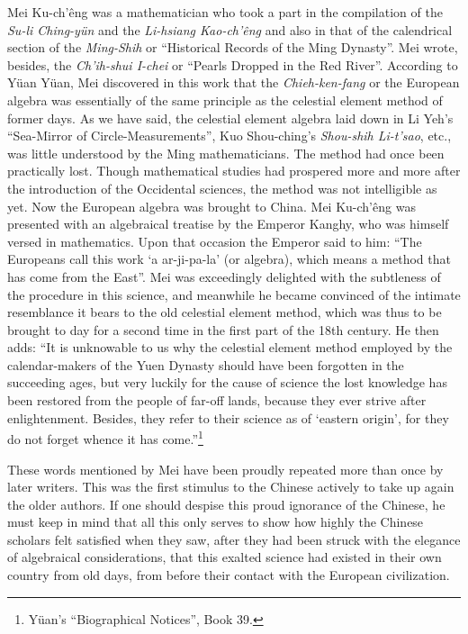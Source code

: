 \documentclass[11pt]{article}
\newcommand{\scanpage}[2]{\clearpage\setcounter{footnote}{0}\noindent{\footnotesize\color{gray}PDF page #1 · #2}\par\medskip}
\newcommand{\scanfooter}{}
\begin{document}
Mei Ku-ch'êng was a mathematician who took a part in the compilation of the \emph{Su-li Ching-yün} and the \emph{Li-hsiang Kao-ch'êng} and also in that of the calendrical section of the \emph{Ming-Shih} or ``Historical Records of the Ming Dynasty''. Mei wrote, besides, the \emph{Ch'ih-shui I-chei} or ``Pearls Dropped in the Red River''. According to Yüan Yüan, Mei discovered in this work that the \emph{Chieh-ken-fang} or the European algebra was essentially of the same principle as the celestial element method of former days. As we have said, the celestial element algebra laid down in Li Yeh's ``Sea-Mirror of Circle-Measurements'', Kuo Shou-ching's \emph{Shou-shih Li-t'sao}, etc., was little understood by the Ming mathematicians. The method had once been practically lost. Though mathematical studies had prospered more and more after the introduction of the Occidental sciences, the method was not intelligible as yet. Now the European algebra was brought to China. Mei Ku-ch'êng was presented with an algebraical treatise by the Emperor Kanghy, who was himself versed in mathematics. Upon that occasion the Emperor said to him: ``The Europeans call this work `a ar-ji-pa-la' (or algebra), which means a method that has come from the East''. Mei was exceedingly delighted with the subtleness of the procedure in this science, and meanwhile he became convinced of the intimate resemblance it bears to the old celestial element method, which was thus to be brought to day for a second time in the first part of the 18th century. He then adds: ``It is unknowable to us why the celestial element method employed by the calendar-makers of the Yuen Dynasty should have been forgotten in the succeeding ages, but very luckily for the cause of science the lost knowledge has been restored from the people of far-off lands, because they ever strive after enlightenment. Besides, they refer to their science as of `eastern origin', for they do not forget whence it has come.''\footnote{Yüan's ``Biographical Notices'', Book 39.}
\scanfooter

\scanpage{0135}{Chapter 18, printed page 121}
These words mentioned by Mei have been proudly repeated more than once by later writers. This was the first stimulus to the Chinese actively to take up again the older authors. If one should despise this proud ignorance of the Chinese, he must keep in mind that all this only serves to show how highly the Chinese scholars felt satisfied when they saw, after they had been struck with the elegance of algebraical considerations, that this exalted science had existed in their own country from old days, from before their contact with the European civilization.
\end{document}
